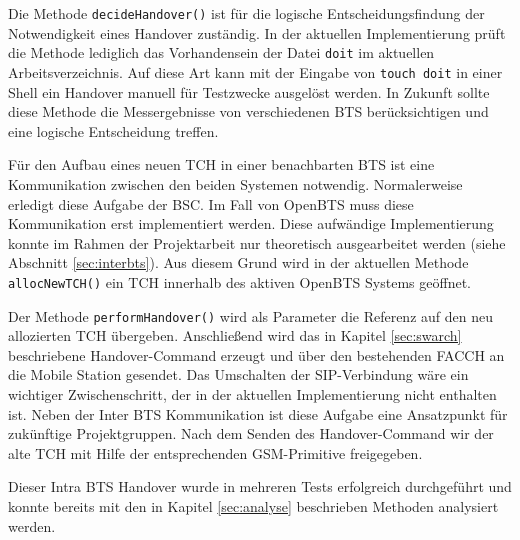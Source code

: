 Die Methode \lstinline{decideHandover()} ist für die logische Entscheidungsfindung der Notwendigkeit eines Handover zuständig. In der aktuellen Implementierung prüft die Methode lediglich das Vorhandensein der Datei \lstinline{doit} im aktuellen Arbeitsverzeichnis. Auf diese Art kann mit der Eingabe von \lstinline{touch doit} in einer Shell ein Handover manuell für Testzwecke ausgelöst werden. In Zukunft sollte diese Methode die Messergebnisse von verschiedenen BTS berücksichtigen und eine logische Entscheidung treffen.

Für den Aufbau eines neuen TCH in einer benachbarten BTS ist eine Kommunikation zwischen den beiden Systemen notwendig. Normalerweise erledigt diese Aufgabe der BSC. Im Fall von OpenBTS muss diese Kommunikation erst implementiert werden. Diese aufwändige Implementierung konnte im Rahmen der Projektarbeit nur theoretisch ausgearbeitet werden (siehe Abschnitt \ref{sec:interbts}). Aus diesem Grund wird in der aktuellen Methode \lstinline{allocNewTCH()} ein TCH innerhalb des aktiven OpenBTS Systems geöffnet.

Der Methode \lstinline{performHandover()} wird als Parameter die Referenz auf den neu allozierten TCH übergeben. Anschließend wird das in Kapitel \ref{sec:swarch} beschriebene Handover-Command erzeugt und über den bestehenden FACCH an die Mobile Station gesendet. Das Umschalten der SIP-Verbindung wäre ein wichtiger Zwischenschritt, der in der aktuellen Implementierung nicht enthalten ist. Neben der Inter BTS Kommunikation ist diese Aufgabe eine Ansatzpunkt für zukünftige Projektgruppen. Nach dem Senden des Handover-Command wir der alte TCH mit Hilfe der entsprechenden GSM-Primitive freigegeben.

Dieser Intra BTS Handover wurde in mehreren Tests erfolgreich durchgeführt und konnte bereits mit den in Kapitel \ref{sec:analyse} beschrieben Methoden analysiert werden.

